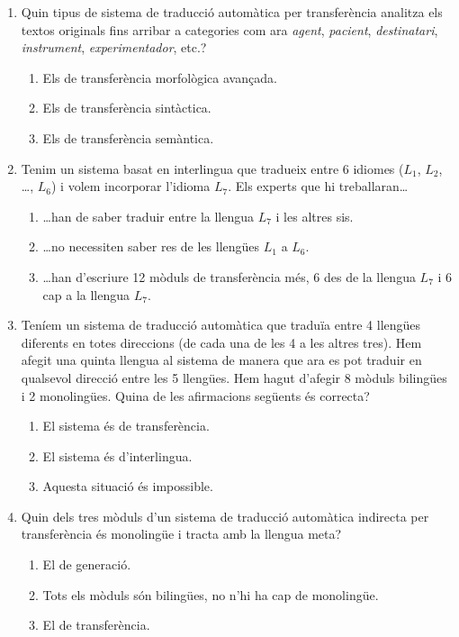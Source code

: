\begin{enumerate}
\item Quin tipus de sistema de traducció automàtica per transferència
  analitza els textos originals fins arribar a categories com ara
  \emph{agent}, \emph{pacient}, \emph{destinatari}, \emph{instrument},
  \emph{experimentador}, etc.?  
  \begin{enumerate}
  \item Els de transferència
    morfològica avançada.
  \item Els de transferència sintàctica.
  \item Els de transferència semàntica.

  \end{enumerate}

  \item Tenim un sistema basat en interlingua que tradueix
    entre 6 idiomes ($L_1$, $L_2$, \ldots, $L_6$) i volem incorporar
    l'idioma $L_7$. Els experts que hi treballaran\ldots
  
    \begin{enumerate}
    \item \ldots han de saber traduir entre la llengua $L_7$ i les
      altres sis.
    \item \ldots no necessiten saber res de les
      llengües $L_1$ a $L_6.$
    \item \ldots han d'escriure 12 mòduls
      de transferència més, 6 des de la llengua $L_7$ i 6 cap a la
      llengua $L_7$.
    \end{enumerate}

  \item Teníem un sistema de traducció automàtica que traduïa entre 4
    llengües diferents en totes direccions (de cada una de les 4 a les
    altres tres). Hem afegit una quinta llengua al sistema de manera
    que ara es pot traduir en qualsevol direcció entre les 5
    llengües. Hem hagut d'afegir 8 mòduls bilingües i 2
    monolingües. Quina de les afirmacions següents és correcta?
      \begin{enumerate}
      \item El sistema és de
        transferència.
      \item  El sistema és d'interlingua.
      \item Aquesta situació és impossible.
      \end{enumerate}

\item 
Quin dels tres mòduls d'un sistema de traducció automàtica indirecta per transferència és monolingüe i tracta amb la llengua meta? 
\begin{enumerate}
\item El de generació.
\item Tots els mòduls són
    bilingües, no n'hi ha cap de monolingüe.
  \item El de transferència.
\end{enumerate}


\end{enumerate}
